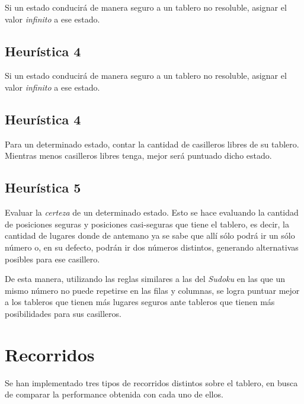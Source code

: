 \documentclass[%
    final,
    reprint,
    notitlepage,
    narroweqnarray,
    inline,
    twoside,
    invited
    ]{ieee}
\begin{document}
\par Si un estado conducirá de manera seguro a un tablero no resoluble, asignar el valor \textit{infinito} a ese estado.

\subsection{Heurística 4}

\par Si un estado conducirá de manera seguro a un tablero no resoluble, asignar el valor \textit{infinito} a ese estado.

\subsection{Heurística 4}

\par Para un determinado estado, contar la cantidad de casilleros libres de su tablero. Mientras menos casilleros libres tenga, mejor será puntuado dicho estado.

\subsection{Heurística 5}

\par Evaluar la \textit{certeza} de un determinado estado. Esto se hace evaluando la cantidad de posiciones seguras y posiciones casi-seguras que tiene el tablero, es decir, la cantidad de lugares donde de antemano ya se sabe que allí sólo podrá ir un sólo número o, en su defecto, podrán ir dos números distintos, generando alternativas posibles para ese casillero.\\
\par De esta manera, utilizando las reglas similares a las del \textit{Sudoku} en las que un mismo número no puede repetirse en las filas y columnas, se logra puntuar mejor a los tableros que tienen más lugares seguros ante tableros que tienen más posibilidades para sus casilleros.

\section{Recorridos}

\par Se han implementado tres tipos de recorridos distintos sobre el tablero, en busca de comparar la performance obtenida con cada uno de ellos.\\
\end{document}
